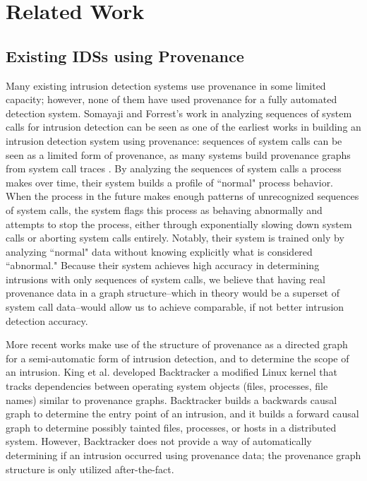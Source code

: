 \documentclass[10pt,twocolumn]{article}
\begin{document}
%

\section{Related Work}

\subsection{Existing IDSs using Provenance}

Many existing intrusion detection systems use provenance in some limited capacity; however, none of them
have used provenance for a fully automated detection system. 
Somayaji and Forrest's work in analyzing sequences of system calls for intrusion detection \cite{somayaji, somayaji-recent} can
be seen as one of the earliest works in building an intrusion detection system using provenance: sequences of
system calls can be seen as a limited form of provenance, as many systems build provenance graphs from
system call traces \cite{spade}. By analyzing the sequences
of system calls a process makes over time, their system builds a profile of ``normal" process behavior. When
the process in the future makes enough patterns of unrecognized sequences of system calls, the system flags
this process as behaving abnormally and attempts to stop the process, either through exponentially slowing down
system calls or aborting system calls entirely. Notably, their system is trained only by analyzing ``normal" data
without knowing explicitly what is considered ``abnormal." Because their system achieves high
accuracy in determining intrusions with only sequences of system calls, we believe that having real provenance
data in a graph structure--which in theory would be a superset of system call data--would allow us
to achieve comparable, if not better intrusion detection accuracy.

More recent works make use of the structure of provenance as a directed graph for a semi-automatic form
of intrusion detection, and to determine the scope of an intrusion. King et al. developed Backtracker \cite{backtracker}
 a modified
Linux kernel that tracks dependencies between operating system objects (files, processes, file names) similar
to provenance graphs. Backtracker builds a backwards causal graph to determine the entry point of an intrusion,
and it builds a forward causal graph to determine possibly tainted files, processes, or hosts in a distributed
system. However, Backtracker does not provide a way of automatically determining if an intrusion occurred
using provenance data; the provenance graph structure is only utilized after-the-fact.
\end{document}

